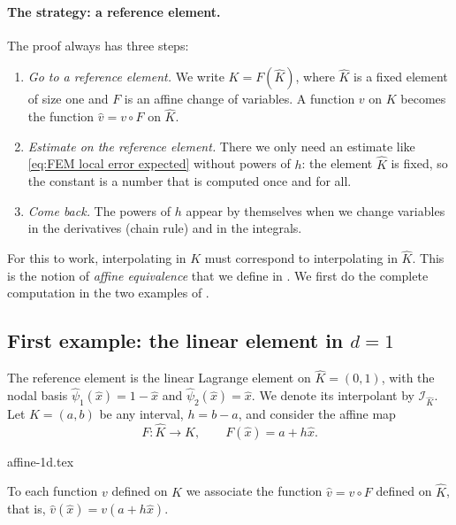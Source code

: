 \paragraph{The strategy: a reference element.}
The proof always has three steps:
\begin{enumerate}
    \item \emph{Go to a reference element.} We write $K = F(\widehat K)$, where $\widehat K$ is a fixed element of size one and $F$ is an affine change of variables. A function $v$ on $K$ becomes the function $\widehat v = v \circ F$ on $\widehat K$.
    \item \emph{Estimate on the reference element.} There we only need an estimate like \eqref{eq:FEM local error expected} without powers of $h$: the element $\widehat K$ is fixed, so the constant is a number that is computed once and for all.
    \item \emph{Come back.} The powers of $h$ appear by themselves when we change variables in the derivatives (chain rule) and in the integrals.
\end{enumerate}
For this to work, interpolating in $K$ must correspond to interpolating in $\widehat K$. This is the notion of \emph{affine equivalence} that we define in .
We first do the complete computation in the two examples of .

\subsection{First example: the linear element in \texorpdfstring{$d = 1$}{d=1}}
\label{sec:FEM affine equivalence d=1}

The reference element is the linear Lagrange element on $\widehat K = (0,1)$, with the nodal basis $\widehat \psi_1 (\widehat x) = 1 - \widehat x$ and $\widehat \psi_2 (\widehat x) = \widehat x$.
We denote its interpolant by $\mathcal I_{\widehat K}$.
Let $K = (a,b)$ be any interval, $h = b - a$, and consider the affine map
\begin{equation*}
    F : \widehat K \to K, \qquad F(\widehat x) = a + h \widehat x.
\end{equation*}
\begin{center}
    {affine-1d.tex}
\end{center}
To each function $v$ defined on $K$ we associate the function $\widehat v = v \circ F$ defined on $\widehat K$, that is, $\widehat v (\widehat x) = v(a + h \widehat x)$.

